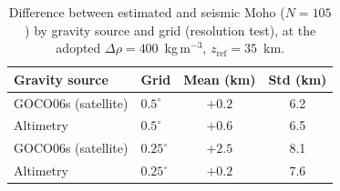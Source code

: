 \documentclass{agutexSI2019}
\begin{document}
\clearpage
\begin{table}
\caption{Difference between estimated and seismic Moho ($N=105$) by gravity source
and grid (resolution test), at the adopted $\Delta\rho=400$~kg\,m$^{-3}$, $z_{\mathrm{ref}}=35$~km.}
\label{tab:s2}
\centering
\begin{tabular}{llcc}
\hline
Gravity source & Grid & Mean (km) & Std (km)\\
\hline
GOCO06s (satellite) & $0.5^{\circ}$  & $+0.2$ & 6.2\\
Altimetry           & $0.5^{\circ}$  & $+0.6$ & 6.5\\
GOCO06s (satellite) & $0.25^{\circ}$ & $+2.5$ & 8.1\\
Altimetry           & $0.25^{\circ}$ & $+0.2$ & 7.6\\
\hline
\end{tabular}
\end{table}

\clearpage
{}
\end{document}
